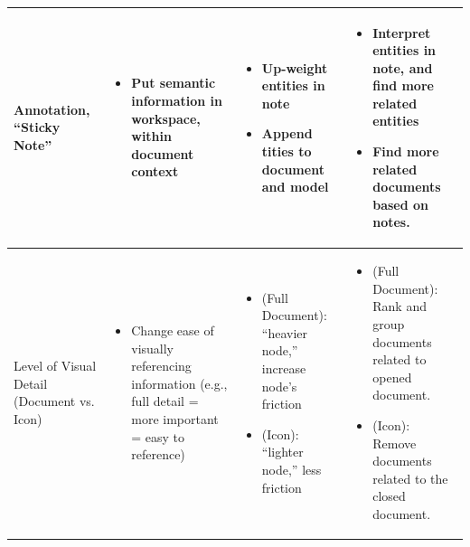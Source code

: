 \documentclass[journal]{vgtc}                %
\begin{document}
\begin{table}[t]
\begin{tabular}{| m{2.5cm} | m{4.5cm} | m{4.5cm} | m{4.5cm} |}
Annotation, “Sticky Note” & \begin{itemize} [leftmargin=.1in]
                                    \item Put semantic information in workspace, within document context
                               \end{itemize}
                          & \begin{itemize} [leftmargin=.1in]
                                    \item Up-weight entities in note
                                    \item Append tities to document and model
                            \end{itemize}
                          & \begin{itemize} [leftmargin=.1in]
                                    \item Interpret entities in note, and find more related entities
                                    \item Find more related documents based on notes.
                            \end{itemize} \\ \hline


Level of Visual \newline Detail (Document vs. Icon) & \begin{itemize} [leftmargin=.1in]
                                                \item Change ease of visually referencing information (e.g., full detail = more important = easy to reference)
                                             \end{itemize}
                                           &  \begin{itemize} [leftmargin=.1in]
                                                \item (Full Document): “heavier node,” increase node’s friction
                                                \item (Icon): “lighter node,” less friction
                                             \end{itemize}
                                           & \begin{itemize} [leftmargin=.1in]
                                                \item (Full Document): Rank and group documents related to opened document.
                                                \item (Icon): Remove documents related to the closed document.
                                             \end{itemize} \\ \hline


\end{tabular}
\end{table}
\end{document}
